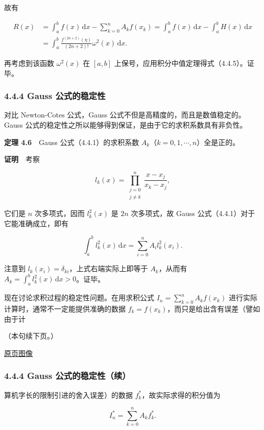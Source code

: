 \documentclass[
  10pt,
  fontset=fandol]{ctexart}
\begin{document}
故有

\[
\begin{aligned}
R(x)&=\int_a^b f(x)\,\mathrm{d}x-\sum_{k=0}^{n}A_kf(x_k)
=\int_a^b f(x)\,\mathrm{d}x-\int_a^b H(x)\,\mathrm{d}x\\
&=\int_a^b\frac{f^{(2n+2)}(\eta)}{(2n+2)!}\omega^2(x)\,\mathrm{d}x.
\end{aligned}
\]

再考虑到该函数 \(\omega^2(x)\) 在 \([a,b]\) 上保号，应用积分中值定理得式（4.4.5）。证毕。

\subsubsection{4.4.4 Gauss 公式的稳定性}\label{gauss-ux516cux5f0fux7684ux7a33ux5b9aux6027}

对比 Newton-Cotes 公式，Gauss 公式不但是高精度的，而且是数值稳定的。Gauss 公式的稳定性之所以能够得到保证，是由于它的求积系数具有非负性。

\textbf{定理 4.6}　Gauss 公式（4.4.1）的求积系数 \(A_k\)（\(k=0,1,\cdots,n\)）全是正的。

\textbf{证明}　考察

\[
l_k(x)=\prod_{\substack{j=0\\j\ne k}}^{n}\frac{x-x_j}{x_k-x_j},
\]

它们是 \(n\) 次多项式，因而 \(l_k^2(x)\) 是 \(2n\) 次多项式，故 Gauss 公式（4.4.1）对于它能准确成立，即有

\[
\int_a^b l_k^2(x)\,\mathrm{d}x=\sum_{i=0}^{n}A_i l_k^2(x_i).
\]

注意到 \(l_k(x_i)=\delta_{ki}\)，上式右端实际上即等于 \(A_k\)，从而有 \(\displaystyle A_k=\int_a^b l_k^2(x)\,\mathrm{d}x>0\)。证毕。

现在讨论求积过程的稳定性问题。在用求积公式 \(\displaystyle I_n=\sum_{k=0}^{n}A_kf(x_k)\) 进行实际计算时，通常不一定能提供准确的数据 \(f_k=f(x_k)\)，而只是给出含有误差（譬如由于计

（本句续下页。）

\href{../../source-images/pdf-110.jpeg}{原页图像}

\subsubsection{4.4.4 Gauss 公式的稳定性（续）}\label{gauss-ux516cux5f0fux7684ux7a33ux5b9aux6027ux7eed}

算机字长的限制引进的舍入误差）的数据 \(f_k^*\)，故实际求得的积分值为

\[
I_n^*=\sum_{k=0}^{n}A_kf_k^*.
\]
\end{document}
